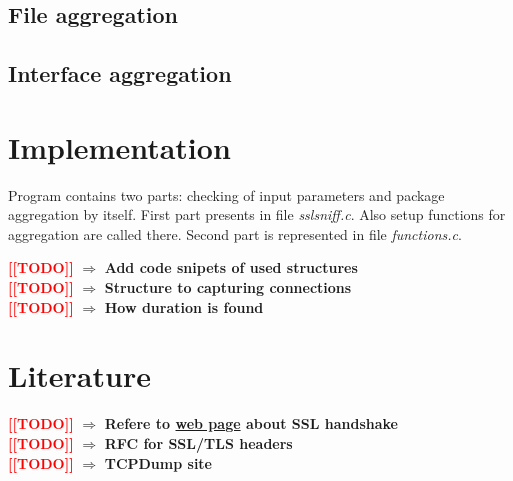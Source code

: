 \documentclass[12pt,a4paper]{article}
\newcommand{\todo}[1]{\textcolor{red}{\textbf{[[TODO]]}} $\Rightarrow$ \textbf{#1}}
\begin{document}
    \subsection{File aggregation}
    
    \subsection{Interface aggregation}
    
    
    \section{Implementation}
    Program contains two parts: checking of input parameters and package aggregation by itself.
    First part presents in file \textit{sslsniff.c}. Also setup functions for aggregation are 
    called there. Second part is represented in file \textit{functions.c}.

    \todo{Add code snipets of used structures}\\
    \todo{Structure to capturing connections}\\
    \todo{How duration is found}


    \section{Literature}

    \todo{Refere to \href{https://www.cloudflare.com/learning/ssl/what-happens-in-a-tls-handshake/}{web page} about SSL handshake}\\
    \todo{RFC for SSL/TLS headers} \\
    \todo{TCPDump site}
\end{document}
